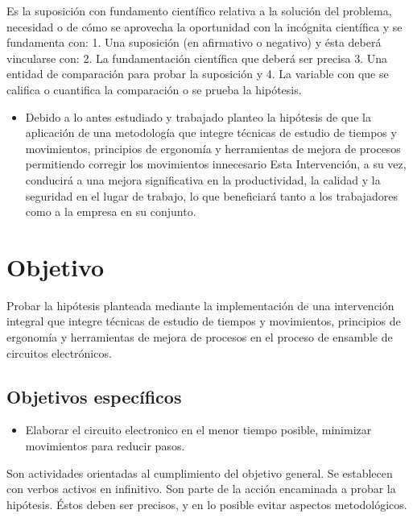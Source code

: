   Es la suposición con fundamento científico relativa a la solución del problema, necesidad o de cómo se aprovecha la oportunidad con la incógnita científica y se fundamenta con: 1. Una suposición (en afirmativo o negativo) y ésta deberá vincularse con:
  2. La fundamentación científica que deberá ser precisa 3. Una entidad de comparación para probar la suposición y
  4. La variable con que se califica o cuantifica la comparación o se prueba la hipótesis.
  
  \begin{itemize}
      \item Debido a lo antes estudiado y trabajado planteo la hipótesis de que la aplicación de una metodología que integre técnicas de estudio de tiempos y movimientos, principios de ergonomía y herramientas de mejora de procesos permitiendo corregir los movimientos innecesario Esta Intervención, a su vez, conducirá a una mejora significativa en la productividad, la calidad y la seguridad en el lugar de trabajo, lo que beneficiará tanto a los trabajadores como a la empresa en su conjunto.
      
  
  \end{itemize}
  \section{Objetivo}
  
  Probar la hipótesis planteada mediante la implementación de una intervención integral que integre técnicas de estudio de tiempos y movimientos, principios de ergonomía y herramientas de mejora de procesos en el proceso de ensamble de circuitos electrónicos.
  
     
  
  \subsection{Objetivos específicos }
  
  \begin{itemize}
      \item Elaborar el circuito electronico  en el menor tiempo posible, minimizar movimientos para reducir pasos.
  \end{itemize}
  
  Son actividades orientadas al cumplimiento del objetivo general. Se establecen con verbos activos en infinitivo. Son parte de la acción encaminada a probar la hipótesis. Éstos deben ser precisos, y en lo posible evitar aspectos metodológicos.
